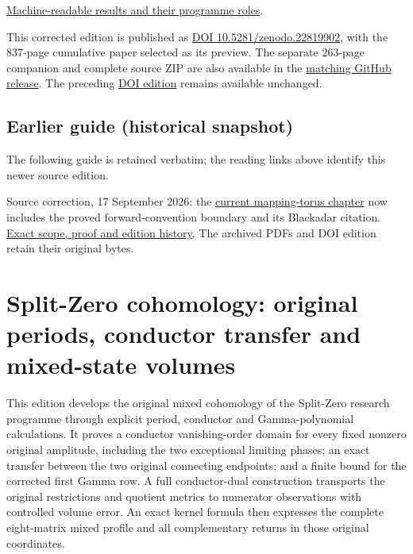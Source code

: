 \documentclass[
]{article}
\begin{document}
\href{https://github.com/KokunoYumeto/zeta-function-research-reader/blob/main/workbenches/splitzero-tandem/continuations/20260917-cited-full-tail-return/research_index/PROGRAM_INDEX.json}{Machine-readable
results and their programme roles}.

This corrected edition is published as
\href{https://zenodo.org/records/22819902}{DOI 10.5281/zenodo.22819902},
with the 837-page cumulative paper selected as its preview. The separate
263-page companion and complete source ZIP are also available in the
\href{https://github.com/KokunoYumeto/zeta-function-research-reader/releases/tag/splitzero-cited-receiver-2026-09-17-9e3f86fa}{matching
GitHub release}. The preceding
\href{https://zenodo.org/records/22814080}{DOI edition} remains
available unchanged.

\subsection{Earlier guide (historical
snapshot)}\label{earlier-guide-historical-snapshot-4}

The following guide is retained verbatim; the reading links above
identify this newer source edition.

Source correction, 17 September 2026: the
\href{https://github.com/KokunoYumeto/zeta-function-research-reader/blob/main/satellites/19e_nonconstant_unit_fibre_k_theory.tex}{current
mapping-torus chapter} now includes the proved forward-convention
boundary and its Blackadar citation.
\href{https://github.com/KokunoYumeto/zeta-function-research-reader/blob/main/workbenches/splitzero-tandem/source-corrections/20260917-mapping-torus-live-propagation/README.md}{Exact
scope, proof and edition history}. The archived PDFs and DOI edition
retain their original bytes.

\section{Split-Zero cohomology: original periods, conductor transfer and
mixed-state
volumes}\label{split-zero-cohomology-original-periods-conductor-transfer-and-mixed-state-volumes}

This edition develops the original mixed cohomology of the Split-Zero
research programme through explicit period, conductor and
Gamma-polynomial calculations. It proves a conductor vanishing-order
domain for every fixed nonzero original amplitude, including the two
exceptional limiting phases; an exact transfer between the two original
connecting endpoints; and a finite bound for the corrected first Gamma
row. A full conductor-dual construction transports the original
restrictions and quotient metrics to numerator observations with
controlled volume error. An exact kernel formula then expresses the
complete eight-matrix mixed profile and all complementary returns in
those original coordinates.
\end{document}
